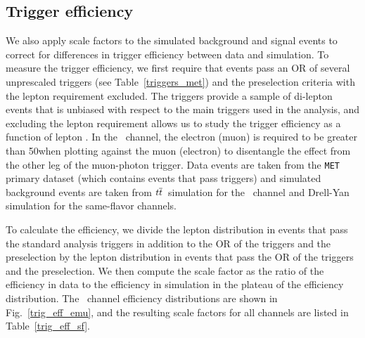 \subsection{Trigger efficiency}
\label{trig_eff}
We also apply scale factors to the simulated background and signal events to correct for differences in trigger efficiency between data and simulation. To measure the trigger efficiency, we first require that events pass an OR of several unprescaled \ptmiss triggers (see Table~\ref{triggers_met}) and the preselection criteria with the lepton \pt requirement excluded. The \ptmiss triggers provide a sample of di-lepton events that is unbiased with respect to the main triggers used in the analysis, and excluding the lepton \pt requirement allows us to study the trigger efficiency as a function of lepton \pt. In the \Pe\Pgm\ channel, the electron (muon) \pt is required to be greater than 50\GeV when plotting against the muon (electron) \pt to disentangle the effect from the other leg of the muon-photon trigger. Data events are taken from the \texttt{MET} primary dataset (which contains events that pass \ptmiss triggers) and simulated background events are taken from $t\overline{t}$\ simulation for the \Pe\Pgm\ channel and Drell-Yan simulation for the same-flavor channels.



To calculate the efficiency, we divide the lepton \pt distribution in events that pass the standard analysis triggers in addition to the OR of the \ptmiss triggers and the preselection by the lepton \pt distribution in events that pass the OR of the \ptmiss triggers and the preselection. We then compute the scale factor as the ratio of the efficiency in data to the efficiency in simulation in the plateau of the efficiency distribution. The \Pe\Pgm\ channel efficiency distributions are shown in Fig.~\ref{trig_eff_emu}, and the resulting scale factors for all channels are listed in Table~\ref{trig_eff_sf}.




\pagebreak